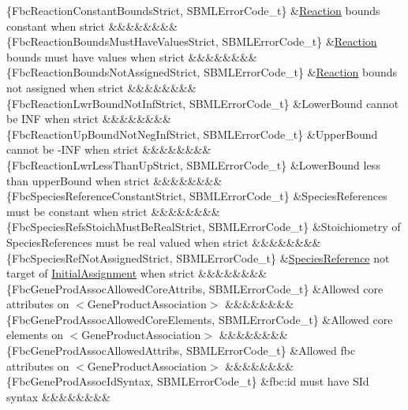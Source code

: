 \begin{DoxyParagraph}{}
\begin{longtabu}
\{Fbc\+Reaction\+Constant\+Bounds\+Strict, S\+B\+M\+L\+Error\+Code\+\_\+t\} &\hyperlink{class_reaction}{Reaction} bounds constant when strict &&&&&&&&\\
\{Fbc\+Reaction\+Bounds\+Must\+Have\+Values\+Strict, S\+B\+M\+L\+Error\+Code\+\_\+t\} &\hyperlink{class_reaction}{Reaction} bounds must have values when strict &&&&&&&&\\
\{Fbc\+Reaction\+Bounds\+Not\+Assigned\+Strict, S\+B\+M\+L\+Error\+Code\+\_\+t\} &\hyperlink{class_reaction}{Reaction} bounds not assigned when strict &&&&&&&&\\
\{Fbc\+Reaction\+Lwr\+Bound\+Not\+Inf\+Strict, S\+B\+M\+L\+Error\+Code\+\_\+t\} &Lower\+Bound cannot be I\+NF when strict &&&&&&&&\\
\{Fbc\+Reaction\+Up\+Bound\+Not\+Neg\+Inf\+Strict, S\+B\+M\+L\+Error\+Code\+\_\+t\} &Upper\+Bound cannot be -\/\+I\+NF when strict &&&&&&&&\\
\{Fbc\+Reaction\+Lwr\+Less\+Than\+Up\+Strict, S\+B\+M\+L\+Error\+Code\+\_\+t\} &Lower\+Bound less than upper\+Bound when strict &&&&&&&&\\
\{Fbc\+Species\+Reference\+Constant\+Strict, S\+B\+M\+L\+Error\+Code\+\_\+t\} &Species\+References must be constant when strict &&&&&&&&\\
\{Fbc\+Species\+Refs\+Stoich\+Must\+Be\+Real\+Strict, S\+B\+M\+L\+Error\+Code\+\_\+t\} &Stoichiometry of Species\+References must be real valued when strict &&&&&&&&\\
\{Fbc\+Species\+Ref\+Not\+Assigned\+Strict, S\+B\+M\+L\+Error\+Code\+\_\+t\} &\hyperlink{class_species_reference}{Species\+Reference} not target of \hyperlink{class_initial_assignment}{Initial\+Assignment} when strict &&&&&&&&\\
\{Fbc\+Gene\+Prod\+Assoc\+Allowed\+Core\+Attribs, S\+B\+M\+L\+Error\+Code\+\_\+t\} &Allowed core attributes on {\ttfamily $<$Gene\+Product\+Association$>$} &&&&&&&&\\
\{Fbc\+Gene\+Prod\+Assoc\+Allowed\+Core\+Elements, S\+B\+M\+L\+Error\+Code\+\_\+t\} &Allowed core elements on {\ttfamily $<$Gene\+Product\+Association$>$} &&&&&&&&\\
\{Fbc\+Gene\+Prod\+Assoc\+Allowed\+Attribs, S\+B\+M\+L\+Error\+Code\+\_\+t\} &Allowed fbc attributes on {\ttfamily $<$Gene\+Product\+Association$>$} &&&&&&&&\\
\{Fbc\+Gene\+Prod\+Assoc\+Id\+Syntax, S\+B\+M\+L\+Error\+Code\+\_\+t\} &\textquotesingle{}fbc\+:id\textquotesingle{} must have S\+Id syntax &&&&&&&&\\

\end{longtabu}
\end{DoxyParagraph}
